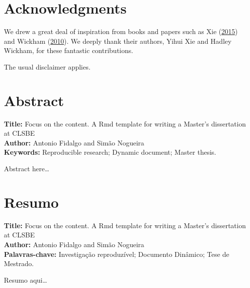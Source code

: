 \documentclass[
  12pt,
]{article}
\begin{document}
\hypertarget{acknowledgments}{%
\section*{Acknowledgments}\label{acknowledgments}}

We drew a great deal of inspiration from books and papers such as Xie (\protect\hyperlink{ref-Xie_2015}{2015}) and Wickham (\protect\hyperlink{ref-Wickham_2010}{2010}). We deeply thank their authors, Yihui Xie and Hadley Wickham, for these fantastic contributions.

The usual disclaimer applies.

\clearpage

\hypertarget{abstract}{%
\section*{Abstract}\label{abstract}}

\textbf{Title:} Focus on the content. A Rmd template for writing a Master's dissertation at CLSBE\\
\textbf{Author:} Antonio Fidalgo and Simão Nogueira\\
\textbf{Keywords:} Reproducible research; Dynamic document; Master thesis.

\vspace{3\baselineskip}

Abstract here\ldots{}

\clearpage

\hypertarget{resumo}{%
\section*{Resumo}\label{resumo}}

\textbf{Title:} Focus on the content. A Rmd template for writing a Master's dissertation at CLSBE\\
\textbf{Author:} Antonio Fidalgo and Simão Nogueira\\
\textbf{Palavras-chave:} Investigação reproduzível; Documento Dinâmico; Tese de Mestrado.

\vspace{3\baselineskip}

Resumo aqui\ldots{}

\clearpage\tableofcontents
\clearpage\listoffigures
\clearpage\listoftables

\clearpage
\end{document}
